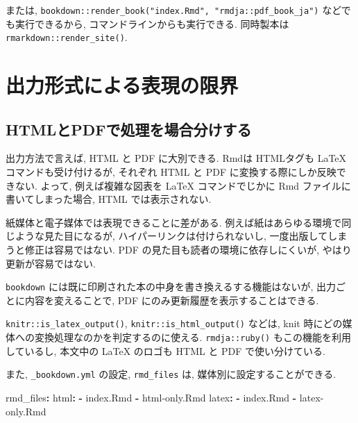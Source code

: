 \documentclass[
  nomag]{bxjsbook}
\newenvironment{Shaded}{\begin{snugshade}}{\end{snugshade}}
\newcommand{\AttributeTok}[1]{\textcolor[rgb]{0.77,0.63,0.00}{#1}}
\newcommand{\FunctionTok}[1]{\textcolor[rgb]{0.00,0.00,0.00}{#1}}
\newcommand{\KeywordTok}[1]{\textcolor[rgb]{0.13,0.29,0.53}{\textbf{#1}}}
\theoremstyle{definition}
\theoremstyle{definition}
\theoremstyle{definition}
\theoremstyle{remark}
\begin{document}
または,
\texttt{bookdown::render\_book("index.Rmd",\ "rmdja::pdf\_book\_ja")}
などでも実行できるから, コマンドラインからも実行できる. 同時製本は
\texttt{rmarkdown::render\_site()}.

\hypertarget{ux51faux529bux5f62ux5f0fux306bux3088ux308bux8868ux73feux306eux9650ux754c}{%
\chapter{出力形式による表現の限界}\label{ux51faux529bux5f62ux5f0fux306bux3088ux308bux8868ux73feux306eux9650ux754c}}

\hypertarget{htmlux3068pdfux3067ux51e6ux7406ux3092ux5834ux5408ux5206ux3051ux3059ux308b}{%
\section{HTMLとPDFで処理を場合分けする}\label{htmlux3068pdfux3067ux51e6ux7406ux3092ux5834ux5408ux5206ux3051ux3059ux308b}}

出力方法で言えば, HTML と PDF に大別できる. Rmdは HTMLタグも LaTeX
コマンドも受け付けるが, それぞれ HTML と PDF
に変換する際にしか反映できない. よって, 例えば複雑な図表を LaTeX
コマンドでじかに Rmd ファイルに書いてしまった場合, HTML
では表示されない.

紙媒体と電子媒体では表現できることに差がある.
例えば紙はあらゆる環境で同じような見た目になるが,
ハイパーリンクは付けられないし, 一度出版してしまうと修正は容易ではない.
PDF の見た目も読者の環境に依存しにくいが, やはり更新が容易ではない.

\texttt{bookdown}
には既に印刷された本の中身を書き換えるする機能はないが,
出力ごとに内容を変えることで, PDF にのみ更新履歴を表示することはできる.

\texttt{knitr::is\_latex\_output()}, \texttt{knitr::is\_html\_output()}
などは, knit 時にどの媒体への変換処理なのかを判定するのに使える.
\texttt{rmdja::ruby()} もこの機能を利用しているし, 本文中の \LaTeX
のロゴも HTML と PDF で使い分けている.

また, \texttt{\_bookdown.yml} の設定, \texttt{rmd\_files} は,
媒体別に設定することができる.

\begin{Shaded}
\begin{Highlighting}[]
\FunctionTok{rmd\_files}\KeywordTok{:}
\AttributeTok{  }\FunctionTok{html}\KeywordTok{:}
\AttributeTok{    }\KeywordTok{{-}}\AttributeTok{ index.Rmd}
\AttributeTok{    }\KeywordTok{{-}}\AttributeTok{ html{-}only.Rmd}
\AttributeTok{  }\FunctionTok{latex}\KeywordTok{:}
\AttributeTok{    }\KeywordTok{{-}}\AttributeTok{ index.Rmd}
\AttributeTok{    }\KeywordTok{{-}}\AttributeTok{ latex{-}only.Rmd}
\end{Highlighting}
\end{Shaded}
\end{document}

